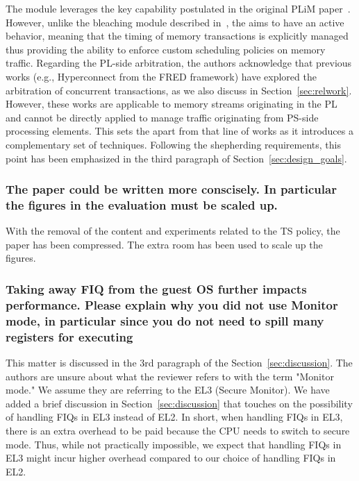         The \schim module leverages the key capability postulated in
        the original PLiM paper~\cite{PLIM20}. However, unlike the
        bleaching module described in~\cite{PLIM20}, the \schim aims
        to have an active behavior, meaning that the timing of memory
        transactions is explicitly managed thus providing the ability
        to enforce custom scheduling policies on memory traffic.
        Regarding the PL-side arbitration, the authors acknowledge
        that previous works (e.g., Hyperconnect from the FRED
        framework) have explored the arbitration of concurrent
        transactions, as we also discuss in
        Section~\ref{sec:relwork}. However, these works are applicable
        to memory streams originating in the PL and cannot be directly
        applied to manage traffic originating from PS-side processing
        elements. This sets the \schim apart from that line of works
        as it introduces a complementary set of techniques. Following
        the shepherding requirements, this point has been emphasized
        in the third paragraph of Section~\ref{sec:design_goals}.



        \subsubsection{The paper could be written more conscisely. In
        particular the figures in the evaluation must be scaled up.}

        With the removal of the content and experiments related to the
        TS policy, the paper has been compressed. The extra room has
        been used to scale up the figures.

        \subsubsection{Taking away FIQ from the guest OS further
        impacts performance. Please explain why you did not use
        Monitor mode, in particular since you do not need to spill
        many registers for executing}

        This matter is discussed in the 3rd paragraph of the
        Section~\ref{sec:discussion}. The authors are unsure about
        what the reviewer refers to with the term "Monitor mode." We
        assume they are referring to the EL3 (Secure Monitor). We have
        added a brief discussion in Section~\ref{sec:discussion} that
        touches on the possibility of handling FIQs in EL3 instead of
        EL2. In short, when handling FIQs in EL3, there is an extra
        overhead to be paid because the CPU needs to switch to secure
        mode. Thus, while not practically impossible, we expect that
        handling FIQs in EL3 might incur higher overhead compared to
        our choice of handling FIQs in EL2.

